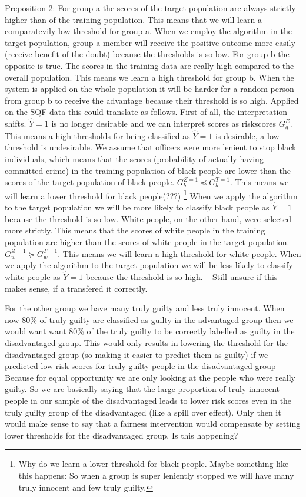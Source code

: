 Preposition 2:
For group a the scores of the target population are always strictly higher than
of the training population. This means that we will learn a comparatevily low threshold for group a.
When we employ the algorithm in the target population, group a member will receive the positive outcome
 more easily (receive benefit of the doubt) because the thresholds is so low. For group b
 the opposite is true. The scores in the training data are really high compared to the overall population.
 This means we learn a high threshold for group b. When the system is applied on the whole population it will
 be harder for a random person from group b to receive the advantage because their threshold is so high.
Applied on the SQF data this could translate as follows. First of all, the interpretation shifts. $\hat{Y} = 1$ is 
no longer desirable and we can interpret scores as riskscores $G_g^{E}$. This means a high thresholds for being classified as $\hat{Y} = 1$ is desirable, a low
threshold is undesirable. We assume that officers were more lenient to stop black individuals, which means that the scores (probability of actually having committed crime) in the training population
of black people are lower than the scores of the target population of black people.
$G_b^{Z=1} \preceq G_b^{T=1}$. This means we will learn a lower threshold for black people(???) \footnote{Why do we learn a lower threshold for black people. Maybe something like this happens: So when a group is super leniently stopped we will have many truly innocent and few truly guilty.}
When we apply the algorithm to the target population we will be more likely to classify black people as $\hat{Y} = 1$ because the threshold is so low. White people, on the other hand,
were selected more strictly. This means that the scores of white people in the training population are higher than the scores of white people in the target population.
$G_w^{Z=1} \succeq G_w^{T=1}$. This means we will learn a high threshold for white people. When we apply the algorithm to the target population we will be less likely to classify white
people as $\hat{Y} = 1$ because the threshold is so high. -- Still unsure if this makes sense, if a transfered it correctly.

For the other group we have many truly guilty and less truly innocent. When now 80\% of truly guilty are classified as guilty in the advantaged group then we would want want 80\% of
the truly guilty to be correctly labelled as guilty in the disadvantaged group. This would only results in lowering the threshold for the disadvantaged group
(so making it easier to predict them as guilty) if we predicted low risk scores for truly guilty people in the disadvantaged group
 Because for equal opportunity we are only looking at the people who were really guilty. So we are basically saying that the large proportion of truly
 innocent people in our sample of the disadvantaged leads to lower risk scores even in the truly guilty group of the disadvantaged (like a spill over effect).
 Only then it would make sense to say that a fairness intervention would compensate by setting lower thresholds for the disadvantaged group. Is this happening? 

